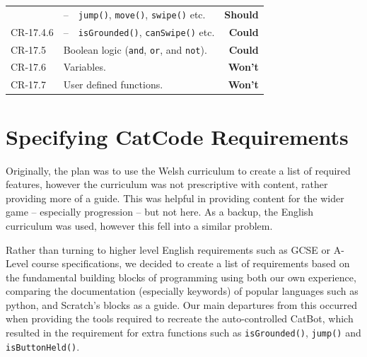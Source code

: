 \begin{center}
\begin{longtable}{lp{0.5cm}p{7cm}r}
    & -- & \texttt{jump()}, \texttt{move()}, \texttt{swipe()} etc.
    & \textbf{Should}
    \\
    CR-17.4.6
    & -- & \texttt{isGrounded()}, \texttt{canSwipe()} etc.
    & \textbf{Could}
    \\
    CR-17.5
    & \multicolumn{2}{l}{Boolean logic (\texttt{and}, \texttt{or}, and \texttt{not}).}
    & \textbf{Could}
    \\
    CR-17.6
    & \multicolumn{2}{l}{Variables.}
    & \textbf{Won't}
    \\
    CR-17.7
    & \multicolumn{2}{l}{User defined functions.}
    & \textbf{Won't}
    \\
    \bottomrule
  \end{longtable}
\end{center}


\section{Specifying CatCode Requirements}

Originally, the plan was to use the Welsh curriculum to create a list of required features, however the curriculum was not prescriptive with content, rather providing more of a guide. This was helpful in providing content for the wider game -- especially progression -- but not here. As a backup, the English curriculum was used, however this fell into a similar problem.

Rather than turning to higher level English requirements such as GCSE or A-Level course specifications, we decided to create a list of requirements based on the fundamental building blocks of programming using both our own experience, comparing the documentation (especially keywords) of popular languages such as python, and Scratch's blocks as a guide. Our main departures from this occurred when providing the tools required to recreate the auto-controlled CatBot, which resulted in the requirement for extra functions such as \texttt{isGrounded()}, \texttt{jump()} and \texttt{isButtonHeld()}. 